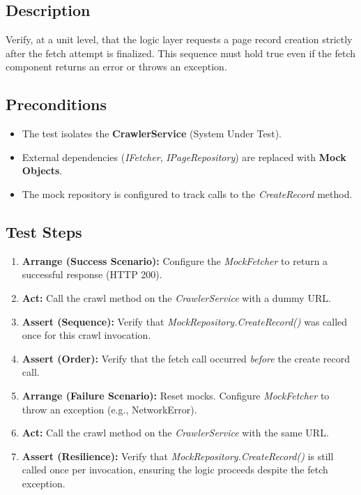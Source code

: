 \documentclass{article}
\begin{document}
\subsection*{Description}
Verify, at a unit level, that the logic layer requests a page record creation strictly after the fetch attempt is finalized. This sequence must hold true even if the fetch component returns an error or throws an exception.

\subsection*{Preconditions}
\begin{itemize}
    \item The test isolates the \textbf{CrawlerService} (System Under Test).
    \item External dependencies (\textit{IFetcher}, \textit{IPageRepository}) are replaced with \textbf{Mock Objects}.
    \item The mock repository is configured to track calls to the \textit{CreateRecord} method.
\end{itemize}

\subsection*{Test Steps}
\begin{enumerate}
    \item \textbf{Arrange (Success Scenario):} Configure the \textit{MockFetcher} to return a successful response (HTTP 200).
    \item \textbf{Act:} Call the crawl method on the \textit{CrawlerService} with a dummy URL.
    \item \textbf{Assert (Sequence):} Verify that \textit{MockRepository.CreateRecord()} was called once for this crawl invocation.
    \item \textbf{Assert (Order):} Verify that the fetch call occurred \textit{before} the create record call.
    \item \textbf{Arrange (Failure Scenario):} Reset mocks. Configure \textit{MockFetcher} to throw an exception (e.g., NetworkError).
    \item \textbf{Act:} Call the crawl method on the \textit{CrawlerService} with the same URL.
    \item \textbf{Assert (Resilience):} Verify that \textit{MockRepository.CreateRecord()} is still called once per invocation, ensuring the logic proceeds despite the fetch exception.
\end{enumerate}
\end{document}
